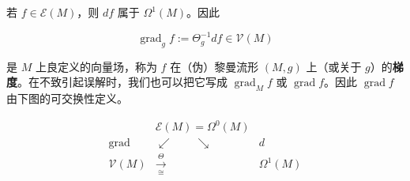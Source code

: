若 $ f \in \mathcal{E}(M) $，则 $ df $ 属于 $ \Omega^{1}(M) $。因此

\[
\operatorname{grad}_{g} f := \Theta_{g}^{-1}df \in \mathcal{V}(M)
\]

是 $ M $ 上良定义的向量场，称为 $ f $ 在（伪）黎曼流形 $ (M, g) $ 上（或关于 $ g $）的\textbf{梯度}。在不致引起误解时，我们也可以把它写成 $ \operatorname{grad}_{M} f $ 或 $ \operatorname{grad} f $。因此 $ \operatorname{grad} f $ 由下图的可交换性定义。

\begin{equation}
\begin{array}{ccc} & \mathcal{E}(M) = \Omega^{0}(M) & \\ \operatorname{grad} & \swarrow \qquad \searrow & d \\ \mathcal{V}(M) & \xrightarrow[\ \cong\ ]{\ \Theta\ } & \Omega^{1}(M) \end{array}\tag{6.4}
\end{equation}

